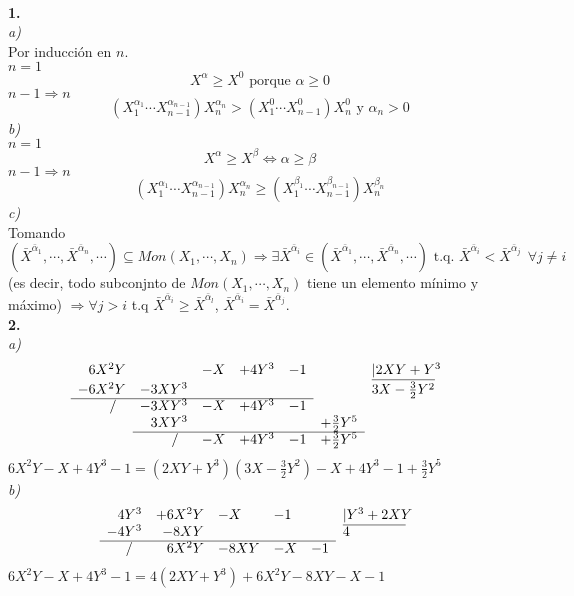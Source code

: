 \documentclass{article}
\begin{document}
\\
\textbf{1.}\\
\textit{a)}\\
Por inducción en $n$.\\
$\boxed{n=1}$
$$
X^\alpha \ge X^0 \text{ porque } \alpha \ge 0
$$
$\boxed{n-1\Rightarrow n}$
$$
(X^{\alpha_1}_1\cdots X^{\alpha_{n-1}}_{n-1})X^{\alpha_n}_n > (X^0_1\cdots X^0_{n-1})X^0_n \text{ y } \alpha_n > 0
$$
\textit{b)}\\
$\boxed{n=1}$
$$
X^\alpha \ge X^\beta \Leftrightarrow \alpha \ge \beta
$$
$\boxed{n-1\Rightarrow n}$
$$
(X^{\alpha_1}_1\cdots X^{\alpha_{n-1}}_{n-1})X^{\alpha_n}_n \ge (X^{\beta_1}_1\cdots X^{\beta_{n-1}}_{n-1})X^{\beta_n}_n
$$
\textit{c)}\\
Tomando $(\bar{X}^{\bar{\alpha}_1},\cdots,\bar{X}^{\bar{\alpha}_n},\cdots)\subseteq Mon(X_1,\cdots,X_n) \Rightarrow \exists \bar{X}^{\bar{\alpha}_i} \in (\bar{X}^{\bar{\alpha}_1},\cdots,\bar{X}^{\bar{\alpha}_n},\cdots) \text{ t.q. } \bar{X}^{\bar{\alpha}_i} < \bar{X}^{\bar{\alpha}_j} \:\: \forall j\ne i$ (es decir, todo subconjnto de $Mon(X_1,\cdots,X_n)$ tiene un elemento mínimo y máximo) $\Rightarrow \forall j>i$ t.q $\bar{X}^{\bar{\alpha}_i} \ge \bar{X}^{\bar{\alpha}_l}$, $\bar{X}^{\bar{\alpha}_i} = \bar{X}^{\bar{\alpha}_j}$.\\
\textbf{2.}\\
\textit{a)}\\
$$
\begin{array}{rrllllllllll}
 6X^2Y &        & -X & +4Y^3 & -1 & & |2XY +Y^3 \\
-6X^2Y & -3XY^3 &    &       &    & & \overline{3X-\frac{3}{2}Y^2} \\
\cline{1-5}
 /\:\:\:     & -3XY^3 & -X & +4Y^3 & -1 & \\
       &  3XY^3 &    &      &     & +\frac{3}{2}Y^5 \\
\cline{2-6}
       & /\:\:\:& -X & +4Y^3 & -1 & +\frac{3}{2}Y^5
\end{array}
$$
$ 6X^2Y -X + 4Y^3 -1 = (2XY+Y^3)(3X-\frac{3}{2}Y^2) -X + 4Y^3 -1 +\frac{3}{2}Y^5$\\
\textit{b)}\\
$$
\begin{array}{rrlllllllllllllllll}
 4Y^3 & +6X^2Y & -X & -1 & & |Y^3+2XY \\
-4Y^3 & -8XY   &    &    & & \overline{4\quad\quad\quad\quad} \\
\cline{1-5}
/\:\:\:     & 6X^2Y & -8XY & -X & -1 \\
\end{array}
$$
$ 6X^2Y -X + 4Y^3 -1 = 4(2XY+Y^3) + 6X^2Y-8XY-X-1$\\
\end{document}
